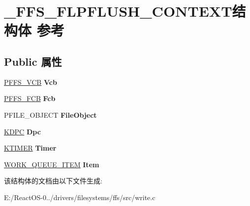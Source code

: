\hypertarget{struct___f_f_s___f_l_p_f_l_u_s_h___c_o_n_t_e_x_t}{}\section{\+\_\+\+F\+F\+S\+\_\+\+F\+L\+P\+F\+L\+U\+S\+H\+\_\+\+C\+O\+N\+T\+E\+X\+T结构体 参考}
\label{struct___f_f_s___f_l_p_f_l_u_s_h___c_o_n_t_e_x_t}
\subsection*{Public 属性}
\begin{DoxyCompactItemize}
\item 
\mbox{\label{struct___f_f_s___f_l_p_f_l_u_s_h___c_o_n_t_e_x_t_ae93b471c64f8cec964c2e690caf8d7c4}} 
\hyperlink{struct___f_f_s___v_c_b}{P\+F\+F\+S\+\_\+\+V\+CB} {\bfseries Vcb}
\item 
\mbox{\label{struct___f_f_s___f_l_p_f_l_u_s_h___c_o_n_t_e_x_t_acdd6837440d429919b9d95b5d0915418}} 
\hyperlink{struct___f_f_s___f_c_b}{P\+F\+F\+S\+\_\+\+F\+CB} {\bfseries Fcb}
\item 
\mbox{\label{struct___f_f_s___f_l_p_f_l_u_s_h___c_o_n_t_e_x_t_a4f584f132ad5c86aab2e0c7c235cf016}} 
P\+F\+I\+L\+E\+\_\+\+O\+B\+J\+E\+CT {\bfseries File\+Object}
\item 
\mbox{\label{struct___f_f_s___f_l_p_f_l_u_s_h___c_o_n_t_e_x_t_add1e8d338cf93675537ef0a23fb655da}} 
\hyperlink{struct___k_d_p_c}{K\+D\+PC} {\bfseries Dpc}
\item 
\mbox{\label{struct___f_f_s___f_l_p_f_l_u_s_h___c_o_n_t_e_x_t_a12230fdb4545f113b31d3ab3c65a8e6a}} 
\hyperlink{struct___k_t_i_m_e_r}{K\+T\+I\+M\+ER} {\bfseries Timer}
\item 
\mbox{\label{struct___f_f_s___f_l_p_f_l_u_s_h___c_o_n_t_e_x_t_a49876b1f2a3aef302033eab692afac38}} 
\hyperlink{struct___w_o_r_k___q_u_e_u_e___i_t_e_m}{W\+O\+R\+K\+\_\+\+Q\+U\+E\+U\+E\+\_\+\+I\+T\+EM} {\bfseries Item}
\end{DoxyCompactItemize}


该结构体的文档由以下文件生成\+:\begin{DoxyCompactItemize}
\item 
E\+:/\+React\+O\+S-\/0../drivers/filesystems/ffs/src/write.\+c\end{DoxyCompactItemize}
